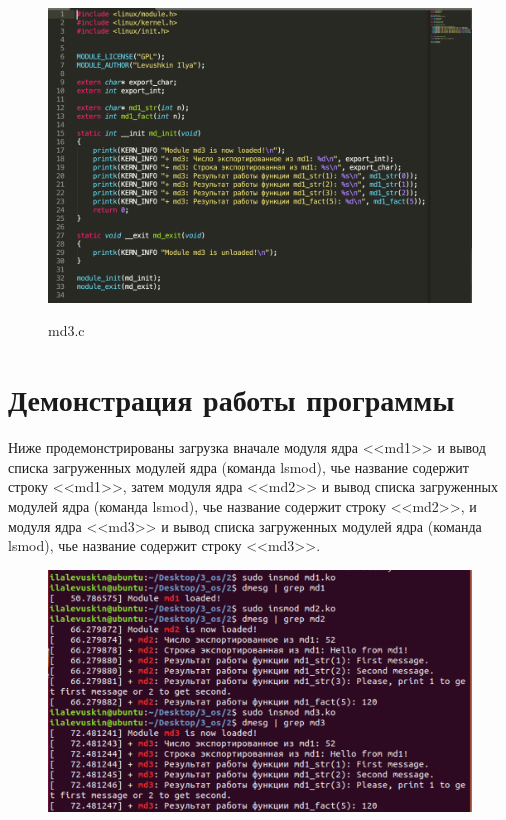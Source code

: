 \documentclass[a4paper,12pt]{article}
\begin{document}
	\begin{figure}[h!]
		\begin{center}
			{\includegraphics[scale = 0.65]{listing_md3.png}}
			\label{listing_md3}
		\end{center}
		\caption{md3.c}
	\end{figure}

	\newpage
	
	\section*{Демонстрация работы программы}
	
	Ниже продемонстрированы загрузка вначале модуля ядра <<md1>> и вывод списка загруженных модулей ядра (команда lsmod), чье название содержит строку <<md1>>, затем модуля ядра <<md2>> и вывод списка загруженных модулей ядра (команда lsmod), чье название содержит строку <<md2>>, и модуля ядра <<md3>> и вывод списка загруженных модулей ядра (команда lsmod), чье название содержит строку <<md3>>.
	
	\begin{figure}[h!]
		\begin{center}
			{\includegraphics[scale = 0.7]{3.png}}
			\label{3}
		\end{center}
	\end{figure}
	
\end{document}
